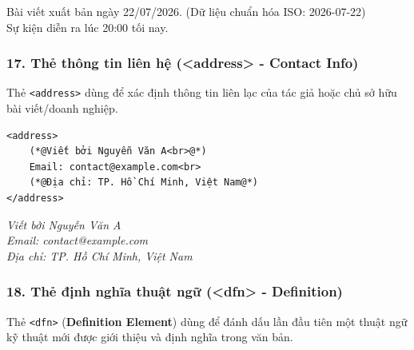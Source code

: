 \documentclass[11pt,oneside]{book}
\newcommand{\codeinline}[1]{\textcolor{accentOrange}{\texttt{#1}}}
\begin{document}
\begin{tcolorbox}[
    enhanced, colback=white, colframe=primaryBlue!20, arc=6pt, boxrule=0.8pt, drop shadow=black!3!white,
    top=8pt, bottom=8pt, left=12pt, right=12pt,
    title={\sffamily\bfseries\scriptsize\color{codeComment} KẾT QUẢ HIỂN THỊ TRÊN TRÌNH DUYỆT (BROWSER PREVIEW)},
    coltitle=codeComment, colbacktitle=codeBg!80!white
]
Bài viết xuất bản ngày 22/07/2026. \hfill \scriptsize\color{codeComment}(Dữ liệu chuẩn hóa ISO: 2026-07-22)\\[3pt]
Sự kiện diễn ra lúc 20:00 tối nay.
\end{tcolorbox}

\subsubsection{17. Thẻ thông tin liên hệ (<address> - Contact Info)}

Thẻ \codeinline{<address>} dùng để xác định thông tin liên lạc của tác giả hoặc chủ sở hữu bài viết/doanh nghiệp.

\begin{codeWindow}
\begin{lstlisting}[language=HTML5]
<address>
    (*@Viết bởi Nguyễn Văn A<br>@*)
    Email: contact@example.com<br>
    (*@Địa chỉ: TP. Hồ Chí Minh, Việt Nam@*)
</address>
\end{lstlisting}
\end{codeWindow}

\begin{tcolorbox}[
    enhanced, colback=white, colframe=primaryBlue!20, arc=6pt, boxrule=0.8pt, drop shadow=black!3!white,
    top=8pt, bottom=8pt, left=12pt, right=12pt,
    title={\sffamily\bfseries\scriptsize\color{codeComment} KẾT QUẢ HIỂN THỊ TRÊN TRÌNH DUYỆT (BROWSER PREVIEW)},
    coltitle=codeComment, colbacktitle=codeBg!80!white
]
{\itshape
Viết bởi Nguyễn Văn A\\
Email: contact@example.com\\
Địa chỉ: TP. Hồ Chí Minh, Việt Nam
}
\end{tcolorbox}

\subsubsection{18. Thẻ định nghĩa thuật ngữ (<dfn> - Definition)}

Thẻ \codeinline{<dfn>} (\textbf{Definition Element}) dùng để đánh dấu lần đầu tiên một thuật ngữ kỹ thuật mới được giới thiệu và định nghĩa trong văn bản.
\end{document}
